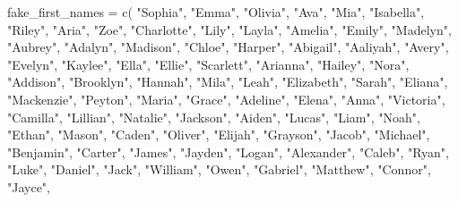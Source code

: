 \documentclass[
]{article}
\newenvironment{Shaded}{\begin{snugshade}}{\end{snugshade}}
\newcommand{\FunctionTok}[1]{\textcolor[rgb]{0.00,0.00,0.00}{#1}}
\newcommand{\NormalTok}[1]{#1}
\newcommand{\OtherTok}[1]{\textcolor[rgb]{0.56,0.35,0.01}{#1}}
\newcommand{\StringTok}[1]{\textcolor[rgb]{0.31,0.60,0.02}{#1}}
\begin{document}
\begin{Shaded}
\begin{Highlighting}[]
\NormalTok{fake\_first\_names }\OtherTok{=} \FunctionTok{c}\NormalTok{(}
  \StringTok{"Sophia"}\NormalTok{, }\StringTok{"Emma"}\NormalTok{, }\StringTok{"Olivia"}\NormalTok{, }\StringTok{"Ava"}\NormalTok{, }\StringTok{"Mia"}\NormalTok{, }\StringTok{"Isabella"}\NormalTok{, }\StringTok{"Riley"}\NormalTok{, }
  \StringTok{"Aria"}\NormalTok{, }\StringTok{"Zoe"}\NormalTok{, }\StringTok{"Charlotte"}\NormalTok{, }\StringTok{"Lily"}\NormalTok{, }\StringTok{"Layla"}\NormalTok{, }\StringTok{"Amelia"}\NormalTok{, }\StringTok{"Emily"}\NormalTok{, }
  \StringTok{"Madelyn"}\NormalTok{, }\StringTok{"Aubrey"}\NormalTok{, }\StringTok{"Adalyn"}\NormalTok{, }\StringTok{"Madison"}\NormalTok{, }\StringTok{"Chloe"}\NormalTok{, }\StringTok{"Harper"}\NormalTok{, }
  \StringTok{"Abigail"}\NormalTok{, }\StringTok{"Aaliyah"}\NormalTok{, }\StringTok{"Avery"}\NormalTok{, }\StringTok{"Evelyn"}\NormalTok{, }\StringTok{"Kaylee"}\NormalTok{, }\StringTok{"Ella"}\NormalTok{, }\StringTok{"Ellie"}\NormalTok{, }
  \StringTok{"Scarlett"}\NormalTok{, }\StringTok{"Arianna"}\NormalTok{, }\StringTok{"Hailey"}\NormalTok{, }\StringTok{"Nora"}\NormalTok{, }\StringTok{"Addison"}\NormalTok{, }\StringTok{"Brooklyn"}\NormalTok{, }
  \StringTok{"Hannah"}\NormalTok{, }\StringTok{"Mila"}\NormalTok{, }\StringTok{"Leah"}\NormalTok{, }\StringTok{"Elizabeth"}\NormalTok{, }\StringTok{"Sarah"}\NormalTok{, }\StringTok{"Eliana"}\NormalTok{, }\StringTok{"Mackenzie"}\NormalTok{, }
  \StringTok{"Peyton"}\NormalTok{, }\StringTok{"Maria"}\NormalTok{, }\StringTok{"Grace"}\NormalTok{, }\StringTok{"Adeline"}\NormalTok{, }\StringTok{"Elena"}\NormalTok{, }\StringTok{"Anna"}\NormalTok{, }\StringTok{"Victoria"}\NormalTok{, }
  \StringTok{"Camilla"}\NormalTok{, }\StringTok{"Lillian"}\NormalTok{, }\StringTok{"Natalie"}\NormalTok{, }\StringTok{"Jackson"}\NormalTok{, }\StringTok{"Aiden"}\NormalTok{, }\StringTok{"Lucas"}\NormalTok{, }
  \StringTok{"Liam"}\NormalTok{, }\StringTok{"Noah"}\NormalTok{, }\StringTok{"Ethan"}\NormalTok{, }\StringTok{"Mason"}\NormalTok{, }\StringTok{"Caden"}\NormalTok{, }\StringTok{"Oliver"}\NormalTok{, }\StringTok{"Elijah"}\NormalTok{, }
  \StringTok{"Grayson"}\NormalTok{, }\StringTok{"Jacob"}\NormalTok{, }\StringTok{"Michael"}\NormalTok{, }\StringTok{"Benjamin"}\NormalTok{, }\StringTok{"Carter"}\NormalTok{, }\StringTok{"James"}\NormalTok{, }
  \StringTok{"Jayden"}\NormalTok{, }\StringTok{"Logan"}\NormalTok{, }\StringTok{"Alexander"}\NormalTok{, }\StringTok{"Caleb"}\NormalTok{, }\StringTok{"Ryan"}\NormalTok{, }\StringTok{"Luke"}\NormalTok{, }\StringTok{"Daniel"}\NormalTok{, }
  \StringTok{"Jack"}\NormalTok{, }\StringTok{"William"}\NormalTok{, }\StringTok{"Owen"}\NormalTok{, }\StringTok{"Gabriel"}\NormalTok{, }\StringTok{"Matthew"}\NormalTok{, }\StringTok{"Connor"}\NormalTok{, }\StringTok{"Jayce"}\NormalTok{, }

\end{Highlighting}
\end{Shaded}
\end{document}
